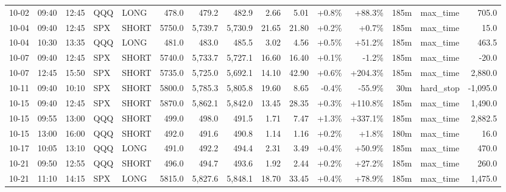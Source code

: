 \documentclass[11pt,a4paper,twoside]{article}
\begin{document}
\begin{landscape}
\begin{center}
\begin{longtable}{>{\color{txtmain}}l l l l l r r r r r r r r >{\color{txtmain}}l r}
10-02 & 09:40 & 12:45 & QQQ & LONG & 478.0 & 479.2 & 482.9 & 2.66 & 5.01 & \textcolor{wingreen}{+0.8\%} & \textcolor{wingreen}{+88.3\%} & 185m & max\_time & \textcolor{wingreen}{705.0} \\
10-04 & 09:40 & 12:45 & SPX & SHORT & 5750.0 & 5,739.7 & 5,730.9 & 21.65 & 21.80 & \textcolor{wingreen}{+0.2\%} & \textcolor{wingreen}{+0.7\%} & 185m & max\_time & \textcolor{wingreen}{15.0} \\
10-04 & 10:30 & 13:35 & QQQ & LONG & 481.0 & 483.0 & 485.5 & 3.02 & 4.56 & \textcolor{wingreen}{+0.5\%} & \textcolor{wingreen}{+51.2\%} & 185m & max\_time & \textcolor{wingreen}{463.5} \\
10-07 & 09:40 & 12:45 & SPX & SHORT & 5740.0 & 5,733.7 & 5,727.1 & 16.60 & 16.40 & \textcolor{wingreen}{+0.1\%} & \textcolor{lossred}{-1.2\%} & 185m & max\_time & \textcolor{lossred}{-20.0} \\
10-07 & 12:45 & 15:50 & SPX & SHORT & 5735.0 & 5,725.0 & 5,692.1 & 14.10 & 42.90 & \textcolor{wingreen}{+0.6\%} & \textcolor{wingreen}{+204.3\%} & 185m & max\_time & \textcolor{wingreen}{2,880.0} \\
10-11 & 09:40 & 10:10 & SPX & SHORT & 5800.0 & 5,785.3 & 5,805.8 & 19.60 & 8.65 & \textcolor{lossred}{-0.4\%} & \textcolor{lossred}{-55.9\%} & 30m & hard\_stop & \textcolor{lossred}{-1,095.0} \\
10-15 & 09:40 & 12:45 & SPX & SHORT & 5870.0 & 5,862.1 & 5,842.0 & 13.45 & 28.35 & \textcolor{wingreen}{+0.3\%} & \textcolor{wingreen}{+110.8\%} & 185m & max\_time & \textcolor{wingreen}{1,490.0} \\
10-15 & 09:55 & 13:00 & QQQ & SHORT & 499.0 & 498.0 & 491.5 & 1.71 & 7.47 & \textcolor{wingreen}{+1.3\%} & \textcolor{wingreen}{+337.1\%} & 185m & max\_time & \textcolor{wingreen}{2,882.5} \\
10-15 & 13:00 & 16:00 & QQQ & SHORT & 492.0 & 491.6 & 490.8 & 1.14 & 1.16 & \textcolor{wingreen}{+0.2\%} & \textcolor{wingreen}{+1.8\%} & 180m & max\_time & \textcolor{wingreen}{16.0} \\
10-17 & 10:05 & 13:10 & QQQ & LONG & 491.0 & 492.2 & 494.4 & 2.31 & 3.49 & \textcolor{wingreen}{+0.4\%} & \textcolor{wingreen}{+50.9\%} & 185m & max\_time & \textcolor{wingreen}{470.0} \\
10-21 & 09:50 & 12:55 & QQQ & SHORT & 496.0 & 494.7 & 493.6 & 1.92 & 2.44 & \textcolor{wingreen}{+0.2\%} & \textcolor{wingreen}{+27.2\%} & 185m & max\_time & \textcolor{wingreen}{260.0} \\
10-21 & 11:10 & 14:15 & SPX & LONG & 5815.0 & 5,827.6 & 5,848.1 & 18.70 & 33.45 & \textcolor{wingreen}{+0.4\%} & \textcolor{wingreen}{+78.9\%} & 185m & max\_time & \textcolor{wingreen}{1,475.0} \\

\end{longtable}
\end{center}
\end{landscape}
\end{document}

